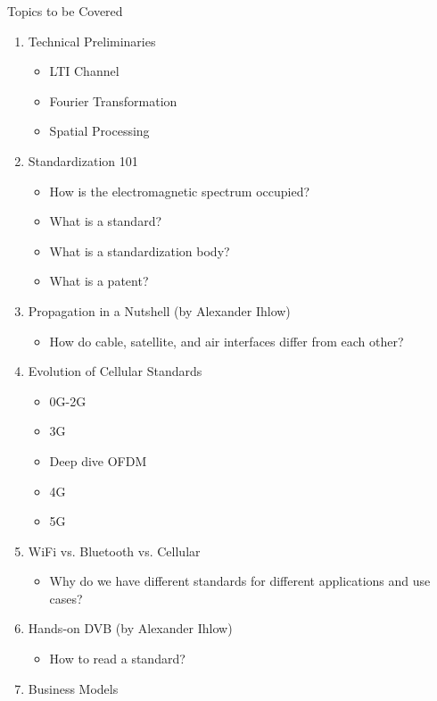 \begin{frame}[allowframebreaks]{Topics to be Covered}
  \begin{enumerate}
    \item Technical Preliminaries
      \begin{itemize}
        \item LTI Channel
        \item Fourier Transformation
        \item Spatial Processing
      \end{itemize}
    \item Standardization 101
      \begin{itemize}
        \item How is the electromagnetic spectrum occupied?
        \item What is a standard?
        \item What is a standardization body?
        \item What is a patent?
      \end{itemize}
    \item Propagation in a Nutshell (by Alexander Ihlow)
      \begin{itemize}
        \item How do cable, satellite, and air interfaces differ from each other?
      \end{itemize}
    \item Evolution of Cellular Standards
      \begin{itemize}
        \item 0G-2G
        \item 3G
        \item Deep dive OFDM
        \item 4G
        \item 5G
      \end{itemize}
      \framebreak
    \item WiFi vs. Bluetooth vs. Cellular
      \begin{itemize}
        \item Why do we have different standards for different applications and use cases?
      \end{itemize}
    \item Hands-on DVB (by Alexander Ihlow)
      \begin{itemize}
        \item How to read a standard?
      \end{itemize}
    \item Business Models

\end{enumerate}
\end{frame}
